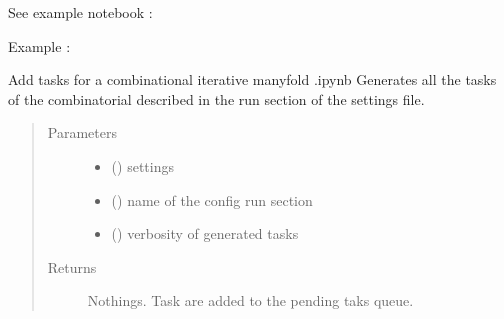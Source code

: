 \documentclass[letterpaper,10pt,english]{sphinxmanual}
\begin{document}
\sphinxAtStartPar
See example notebook : 

\sphinxAtStartPar
Example :

\begin{sphinxVerbatim}[commandchars=\\\{\}]
  
                                                     
\end{sphinxVerbatim}

\begin{fulllineitems}
\label{\detokenize{PyTerK:pyterk.task_manager.add_combinational_iterative_manyfold}}
\sphinxAtStartPar
Add tasks for a combinational iterative manyfold \sphinxhyphen{} .ipynb
Generates all the tasks of the combinatorial described in the run section of the settings file.
\begin{quote}\begin{description}
\item[{Parameters}] \leavevmode\begin{itemize}
\item {} 
\sphinxAtStartPar
{} () \textendash{} settings

\item {} 
\sphinxAtStartPar
{} () \textendash{} name of the config run section

\item {} 
\sphinxAtStartPar
{} () \textendash{} verbosity of generated tasks

\end{itemize}

\item[{Returns}] \leavevmode
\sphinxAtStartPar
Nothings. Task are added to the pending taks queue.

\end{description}\end{quote}

\end{fulllineitems}
\end{document}
